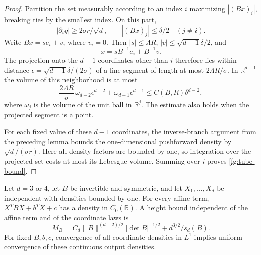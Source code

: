 \begin{proof}
Partition the set measurably according to an index $i$
maximizing $|(Bx)_i|$, breaking ties by the smallest index.
On this part,
\[
 |\partial_iq|\geq2\sigma r/\sqrt d,\qquad
 |(Bx)_j|\leq\delta/2\quad(j\ne i).
\]
Write $Bx=se_i+v$, where $v_i=0$.
Then $|s|\leq\Lambda R$, $|v|\leq\sqrt{d-1}\delta/2$, and
\[
 x=sB^{-1}e_i+B^{-1}v.
\]
The projection onto the $d-1$ coordinates other than $i$
therefore lies within distance
$\epsilon=\sqrt{d-1}\delta/(2\sigma)$ of a line segment of
length at most $2\Lambda R/\sigma$.
In $\mathbb R^{d-1}$ the volume of this neighborhood is at
most
\[
 \frac{2\Lambda R}{\sigma}\,
          \omega_{d-2}\epsilon^{d-2}
       +\omega_{d-1}\epsilon^{d-1}
 \leq C(B,R)\delta^{d-2},
\]
where $\omega_j$ is the volume of the unit ball in
$\mathbb R^j$.  The estimate also holds when the projected
segment is a point.

For each fixed value of these $d-1$ coordinates, the
inverse-branch argument from the preceding lemma bounds
the one-dimensional pushforward density by
$\sqrt d/(\sigma r)$.
Here all density factors are bounded by one, so integration
over the projected set costs at most its Lebesgue volume.
Summing over $i$ proves \eqref{fg:tube-bound}.
\end{proof}

\begin{lemma}
\label{fg:invertible-continuity}
Let $d=3$ or $4$, let $B$ be invertible and symmetric, and let
$X_1,\ldots,X_d$ be independent with densities bounded by one.
For every affine term, $X^TBX+b^TX+c$ has a density in
$C_0(\mathbb R)$.  A height bound independent of the affine
term and of the coordinate laws is
\begin{equation}\label{fg:fixed-block-height}
 M_B=C_d\|B\|^{(d-2)/2}|\det B|^{-1/2}
                +d^{3/2}/s_d(B).
\end{equation}
For fixed $B,b,c$, convergence of all coordinate densities
in $L^1$ implies uniform convergence of these continuous
output densities.
\end{lemma}

